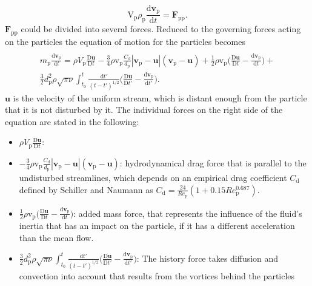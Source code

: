 \documentclass[11pt,a4paper,openany,oneside,parskip=half*]{article}
\renewcommand*\vec[1]{\boldsymbol{#1}}
\begin{document}
\begin{equation}
\mathrm{V}_\mathrm{p} \rho_\mathrm{p} \frac{\mathrm{d}\vec{v}_\mathrm{p}}{\mathrm{d}t} = \vec{F}_\mathrm{pp}.
\end{equation}
$\vec{F}_\mathrm{pp}$ could be divided into several forces. 
Reduced to the governing forces acting on the particles the equation of motion for the particles becomes
\begin{multline} \label{navier_stokes_particle}
\\ m_\mathrm{p} \frac{\mathrm{d}\vec{v}_\mathrm{p}}{\mathrm{d}t} =\rho V_\mathrm{p}\frac{\mathrm{D}\vec{u}}{\mathrm{D}t} -\frac{3}{4}\rho \mathrm{v}_\mathrm{p} \frac{C_\mathrm{d}}{d_\mathrm{p}}|\vec{v}_\mathrm{p}-\vec{u}|(\vec{v}_\mathrm{p}-\vec{u})+ \frac{1}{2}\rho \mathrm{v}_\mathrm{p} \biggl(\frac{\mathrm{D}\vec{u}}{\mathrm{D}t}-\frac{\mathrm{d}\vec{v}_\mathrm{p}}{\mathrm{d}t}\biggl) + 
\\ \frac{3}{2}d_\mathrm{p}^\mathrm{2}\rho\sqrt{\pi\nu}\int_{t_\mathrm{0}}^{t} \frac{\mathrm{d}t'}{(t-t')^\mathrm{1/2}} \biggl(\frac{\mathrm{D}\vec{u}}{\mathrm{D}t'}- \frac{\mathrm{d}\vec{v}_\mathrm{p}}{\mathrm{d}t'}\biggl).
\end{multline}
$\vec{u}$ is the velocity of the uniform stream, which is distant enough from the particle that it is not disturbed by it.
The individual forces on the right side of the equation are stated in the following:
\newline
\begin{itemize} 
\item  $\rho V_\mathrm{p}\frac{\mathrm{D}\vec{u}}{\mathrm{D}t}$: \newline

\item  $-\frac{3}{4}\rho \mathrm{v}_\mathrm{p} \frac{C_\mathrm{d}}{d_\mathrm{p}}|\vec{v}_\mathrm{p}-    \vec{u}|(\vec{v}_\mathrm{p}-\vec{u})$:\newline
hydrodynamical drag force that is parallel to the undisturbed streamlines, which depends on an empirical drag coefficient $C_{\mathrm{d}}$ defined by Schiller and Naumann as
$C_\mathrm{d} = \frac{24}{Re_\mathrm{p}}(1+0.15Re_\mathrm{p}^\mathrm{0.687})$.

\item $\frac{1}{2}\rho \mathrm{v}_\mathrm{p} \biggl(\frac{\mathrm{D}\vec{u}}{\mathrm{D}t}-\frac{\mathrm{d}\vec{v}_\mathrm{p}}{\mathrm{d}t}\biggl)$:\newline
added mass force, that represents the influence of the fluid's inertia that has an impact on the particle, if it has a different acceleration than the mean flow.
\item $\frac{3}{2}d_\mathrm{p}^\mathrm{2}\rho\sqrt{\pi\nu}\int_{t_\mathrm{0}}^{t} \frac{\mathrm{d}t'}{(t-t')^\mathrm{1/2}} \biggl(\frac{\mathrm{D}\vec{u}}{\mathrm{D}t'}- \frac{\mathrm{d}\vec{v}_\mathrm{p}}{\mathrm{d}t'}\biggl) $: \newline
The history force takes diffusion and convection into account that results from the vortices behind the particles 
\end{itemize}
 
\end{document}
